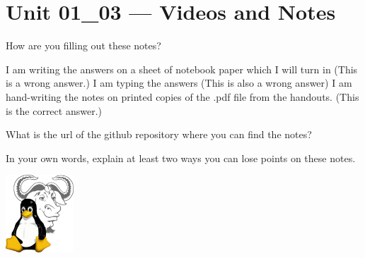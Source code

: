 \documentclass[letterpaper,12pt]{exam}
\begin{document}
\section*{Unit 01\_03 --- Videos and Notes} %

\begin{questions}
\question How are you filling out these notes?
\begin{checkboxes}
\choice I am writing the answers on a sheet of notebook paper which I will turn in (This is a wrong answer.)
\choice I am typing the answers (This is also a wrong answer)
\choice I am hand-writing the notes on printed copies of the .pdf file from the handouts. (This is the correct answer.)
\end{checkboxes}

\question What is the url of the github repository where you can find the notes? 
\vspace{1.5cm}

\question In your own words, explain at least two ways you can lose points on these notes. 
\vspace{1.5cm}


\end{questions}

\includegraphics[width=1in]{tux}\label{end}
\end{document}
